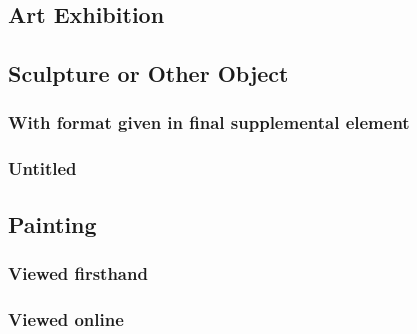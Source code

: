 \documentclass{article}
\begin{document}
\subsection{Art Exhibition} %
\label{sub:art_exhibition}
\begin{refsection}
	\printbibliography[heading=none]
\end{refsection}
\subsection{Sculpture or Other Object} %
\label{sub:sculpture_or_other_object}
\subsubsection{With format given in final supplemental element} %
\label{ssub:with_format_given_in_final_supplemental_element}
\begin{refsection}
	\printbibliography[heading=none]
\end{refsection}
\subsubsection{Untitled} %
\label{ssub:untitled_sculpture}
\begin{refsection}
	\printbibliography[heading=none]
\end{refsection}
\subsection{Painting} %
\label{sub:painting}
\subsubsection{Viewed firsthand} %
\label{ssub:painting_viewed_firsthand}
\begin{refsection}
	\printbibliography[heading=none]
\end{refsection}
\subsubsection{Viewed online} %
\label{ssub:painting_viewed_online}
\begin{refsection}\citereset
	\printbibliography[heading=none]
\end{refsection}
\end{document}
